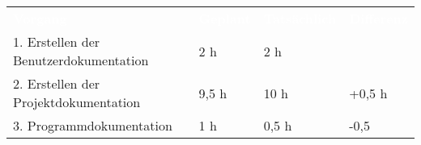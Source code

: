 \begin{tabular}{llll}
\rowcolor{heading}\textcolor{white}{\textbf{Vorgang}} & \textcolor{white}{\textbf{Geplant}} & \textcolor{white}{\textbf{Tatsächlich}} & \textcolor{white}{\textbf{Differenz}} \\
1. Erstellen der Benutzerdokumentation & 2 h   & 2 h   &  \\
\rowcolor{odd}2. Erstellen der Projektdokumentation & 9,5 h   & 10 h   & +0,5 h \\
3. Programmdokumentation & 1 h   & 0,5 h  & -0,5  \\
\end{tabular}
